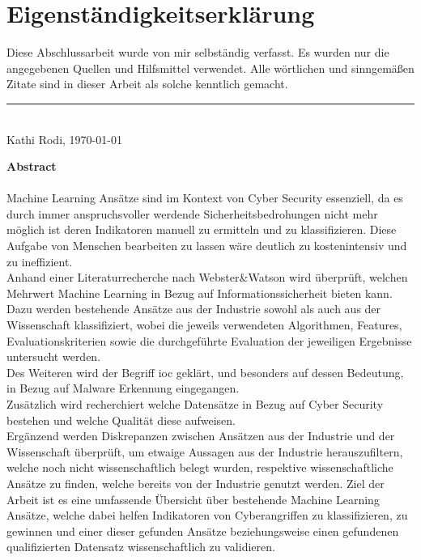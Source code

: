\documentclass[
    12pt, %
    DIV10,
    ngerman, %
    a4paper, %
    oneside, %
    titlepage, %
    parskip=half, %
    headings=normal, %
    listof=totoc, %
    bibliography=totoc, %
    index=totoc, %
    captions=tableheading, %
    final %
]{scrreprt}
\begin{document}
\section*{Eigenständigkeitserklärung}
Diese Abschlussarbeit wurde von mir selbständig verfasst. Es wurden nur die angegebenen
Quellen und Hilfsmittel verwendet. Alle wörtlichen und sinngemäßen Zitate
sind in dieser Arbeit als solche kenntlich gemacht.
\begin{center}
\end{center}
\rule[0.5em]{25em}{0.5pt} \\
Kathi Rodi, \today
 \begin{center}
 \end{center}
\newpage
\noindent \textbf{Abstract}\\\\
\noindent Machine Learning Ansätze sind im Kontext von Cyber Security essenziell, da es durch immer anspruchsvoller werdende Sicherheitsbedrohungen nicht mehr möglich ist deren Indikatoren manuell zu ermitteln und zu klassifizieren. Diese Aufgabe von Menschen bearbeiten zu lassen wäre deutlich zu kostenintensiv und zu ineffizient.\\
\noindent Anhand einer Literaturrecherche nach Webster\&Watson wird überprüft, welchen Mehrwert Machine Learning in Bezug auf Informationssicherheit bieten kann. Dazu werden bestehende Ansätze aus der Industrie sowohl als auch aus der Wissenschaft klassifiziert, wobei die jeweils verwendeten Algorithmen, Features, Evaluationskriterien sowie die durchgeführte Evaluation der jeweiligen Ergebnisse untersucht werden.\\
\noindent Des Weiteren wird der Begriff \acf{ioc} geklärt, und besonders auf dessen Bedeutung, in Bezug auf Malware Erkennung eingegangen.\\
\noindent Zusätzlich wird recherchiert welche Datensätze in Bezug auf Cyber Security bestehen und welche Qualität diese aufweisen.\\
\noindent Ergänzend werden Diskrepanzen zwischen Ansätzen aus der Industrie und der Wissenschaft überprüft, um etwaige Aussagen aus der Industrie herauszufiltern, welche noch nicht wissenschaftlich belegt wurden, respektive wissenschaftliche Ansätze zu finden, welche bereits von der Industrie genutzt werden.
\noindent Ziel der Arbeit ist es eine umfassende Übersicht über bestehende Machine Learning Ansätze, welche dabei helfen Indikatoren von Cyberangriffen zu klassifizieren, zu gewinnen und einer dieser gefunden Ansätze beziehungsweise einen gefundenen qualifizierten Datensatz wissenschaftlich zu validieren. 
\newpage
{}
\tableofcontents
{}
\newpage
\end{document}

